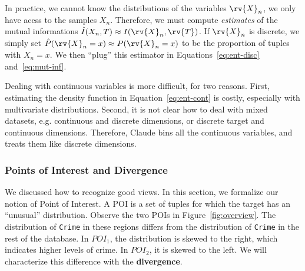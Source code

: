 In practice, we cannot know the distributions of the variables $\rv{X}_n$, we
only have acess to the samples $X_n$. Therefore, we must compute \emph{estimates}
of the mutual informations $\hat{I}(X_n, T) \approx I(\rv{X}_n, \rv{T})$.  If
$\rv{X}_n$ is discrete, we simply set $\hat{P}(\rv{X}_n = x) \approx P(\rv{X}_n =
x)$ to be the proportion of tuples with $X_n=x$. We then ``plug'' this
estimator in Equations~\ref{eq:ent-disc} and~\ref{eq:mut-inf}.

Dealing with continuous variables is more difficult, for two reasons. First,
estimating the density function in Equation~\ref{eq:ent-cont} is costly,
especially with multivariate distributions.  Second, it is not clear how to
deal with mixed datasets, e.g. continuous and discrete dimensions, or discrete
target and continuous dimensions.  Therefore, Claude bins all the continuous
variables, and treats them like discrete dimensions.

\subsubsection{Points of Interest and Divergence}

We discussed how to recognize good views. In this section, we formalize our
notion of Point of Interest. A POI is a set of tuples for which the target has
an ``unusual'' distribution. Observe the two POIs in Figure~\ref{fig:overview}.
The distribution of \texttt{Crime} in these regions differs from the
distribution of \texttt{Crime} in the rest of the database.  In $POI_1$, the
distribution is skewed to the right, which indicates higher levels of crime. In
$POI_2$, it is skewed to the left. We will characterize this difference with the
\textbf{divergence}.

